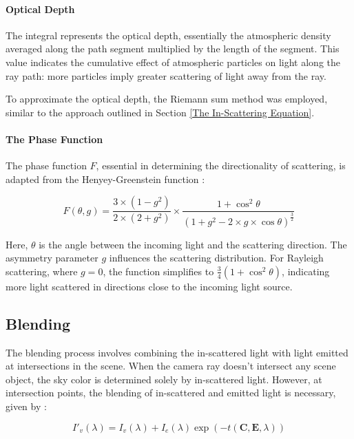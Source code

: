 \paragraph{Optical Depth}
\label{Optical Depth}

The integral represents the optical depth, essentially the atmospheric density averaged along the path segment multiplied by the length of the segment. This value indicates the cumulative effect of atmospheric particles on light along the ray path: more particles imply greater scattering of light away from the ray.

To approximate the optical depth, the Riemann sum method was employed, similar to the approach outlined in Section \ref{The In-Scattering Equation}.

\paragraph{The Phase Function}

The phase function $F$, essential in determining the directionality of scattering, is adapted from the Henyey-Greenstein function \cite{nishita_display_1993}:

\begin{equation}
    F(\theta, g) = \frac{3 \times (1 - g^2)}{2 \times (2 + g^2)} \times \frac{1 + \cos^2 \theta}{(1 + g^2 - 2 \times g \times \cos \theta)^{\frac{3}{2}}}
\end{equation}

Here, $\theta$ is the angle between the incoming light and the scattering direction. The asymmetry parameter $g$ influences the scattering distribution. For Rayleigh scattering, where $g = 0$, the function simplifies to $\frac{3}{4}(1 + \cos^2\theta)$, indicating more light scattered in directions close to the incoming light source.

\subsection{Blending}

The blending process involves combining the in-scattered light with light emitted at intersections in the scene. When the camera ray doesn't intersect any scene object, the sky color is determined solely by in-scattered light. However, at intersection points, the blending of in-scattered and emitted light is necessary, given by \cite{nishita_display_1993}:

\begin{equation}
    I'_v(\lambda) = I_v(\lambda) + I_e(\lambda)\exp(-t(\mathbf{C}, \mathbf{E}, \lambda))
\end{equation}

